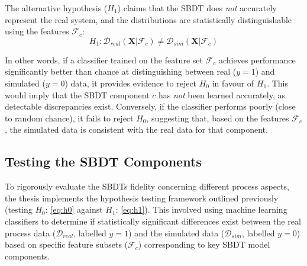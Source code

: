 \noindent The alternative hypothesis ($H_1$) claims that the SBDT does \textit{not} accurately represent the real system, and the distributions are statistically distinguishable using the features $\mathcal{F}_c$:
\begin{equation}
    H_1: \mathcal{D}_{real}(\mathbf{X} | \mathcal{F}_c) \neq \mathcal{D}_{sim}(\mathbf{X} | \mathcal{F}_c)
    \label{eq:h1}
\end{equation}

\noindent In other words, if a classifier trained on the feature set $\mathcal{F}_c$ achieves performance significantly better than chance at distinguishing between real ($y=1$) and simulated ($y=0$) data, it provides evidence to reject $H_0$ in favour of $H_1$. This would imply that the SBDT component $c$ has \textit{not} been learned accurately, as detectable discrepancies exist. Conversely, if the classifier performs poorly (close to random chance), it fails to reject $H_0$, suggesting that, based on the features $\mathcal{F}_c$, the simulated data is consistent with the real data for that component.

\subsection*{Testing the SBDT Components}
To rigorously evaluate the SBDTs fidelity concerning different process aspects, the thesis implements the hypothesis testing framework outlined previously (testing $H_0$: \autoref{eq:h0} against $H_1$: \autoref{eq:h1}). This involved using machine learning classifiers to determine if statistically significant differences exist between the real process data ($\mathcal{D}_{real}$, labelled $y=1$) and the simulated data ($\mathcal{D}_{sim}$, labelled $y=0$) based on specific feature subsets ($\mathcal{F}_c$) corresponding to key SBDT model components.

